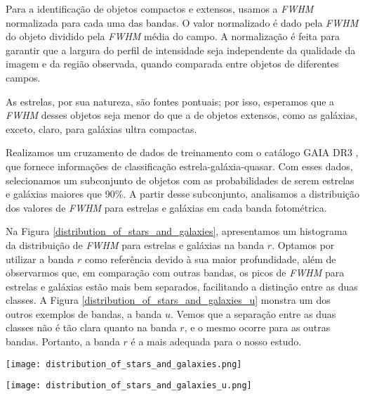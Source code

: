 Para a identificação de objetos compactos e extensos, usamos a \textit{FWHM} normalizada para cada uma das bandas. O valor normalizado é dado pela \textit{FWHM} do objeto dividido pela \textit{FWHM} média do campo. A normalização é feita para garantir que a largura do perfil de intensidade seja independente da qualidade da imagem e da região observada, quando comparada entre objetos de diferentes campos.

As estrelas, por sua natureza, são fontes pontuais; por isso, esperamos que a \textit{FWHM} desses objetos seja menor do que a de objetos extensos, como as galáxias, exceto, claro, para galáxias ultra compactas.

Realizamos um cruzamento de dados de treinamento com o catálogo GAIA DR3 \citep{GAIA_DR3}, que fornece informações de classificação estrela-galáxia-quasar. Com esses dados, selecionamos um subconjunto de objetos com as probabilidades de serem estrelas e galáxias maiores que 90\%. A partir desse subconjunto, analisamos a distribuição dos valores de \textit{FWHM} para estrelas e galáxias em cada banda fotométrica.

Na Figura \ref{distribution_of_stars_and_galaxies}, apresentamos um histograma da distribuição de \textit{FWHM} para estrelas e galáxias na banda $r$. Optamos por utilizar a banda $r$ como referência devido à sua maior profundidade, além de observarmos que, em comparação com outras bandas, os picos de \textit{FWHM} para estrelas e galáxias estão mais bem separados, facilitando a distinção entre as duas classes. A Figura \ref{distribution_of_stars_and_galaxies_u} monstra um dos outros exemplos de bandas, a banda $u$. Vemos que a separação entre as duas classes não é tão clara quanto na banda $r$, e o mesmo ocorre para as outras bandas. Portanto, a banda $r$ é a mais adequada para o nosso estudo. 


\begin{center}
    \begin{minipage}{0.45\textwidth}
        \centering
        \texttt{[image: distribution\_of\_stars\_and\_galaxies.png]}
        \captionsetup{}
        \label{distribution_of_stars_and_galaxies}
    \end{minipage}
    \hfill
    \begin{minipage}{0.45\textwidth}
        \centering
        \texttt{[image: distribution\_of\_stars\_and\_galaxies\_u.png]}
        \captionsetup{}
        \label{distribution_of_stars_and_galaxies_u}
    \end{minipage}
\end{center}

